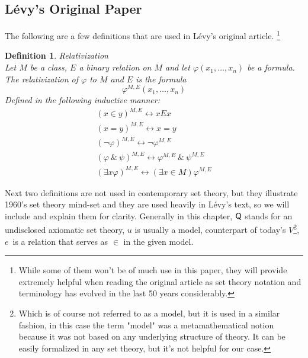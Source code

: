 \documentclass[12pt,a4paper]{article}
\newtheorem{definition}[theorem]{Definition}
\renewcommand{\iff}{\leftrightarrow}
\begin{document}
\subsection{Lévy's Original Paper}\label{sec:Levy1960}

The following are a few definitions that are used in Lévy's original article. \footnote{While some of them won't be of much use in this paper, they will provide extremely helpful when reading the original article as set theory notation and terminology has evolved in the last 50 years considerably.}

\begin{definition}{Relativization}\label{def:relativization}\cite[Definition 12.6]{JechBook}\\ 
Let $M$ be a class, $E$ a binary relation on $M$ and let $\varphi(x_1, \ldots, x_n)$ be a formula. The relativization of $\varphi$ to $M$ and $E$ is the formula
\begin{equation}
\varphi^{M, E}(x_1, \ldots, x_n)
\end{equation}
Defined in the following inductive manner:
\begin{equation}
\begin{split}
(x \in y)^{M,E} \iff x E x\\
(x = y)^{M,E} \iff x = y\\
(\neg \varphi)^{M,E} \iff \neg \varphi^{M,E}\\
(\varphi\ \&\ \psi)^{M,E} \iff \varphi^{M,E}\ \&\ \psi^{M,E}\\
(\exists x\varphi)^{M,E} \iff (\exists x \in M) \varphi^{M,E}
\end{split}
\end{equation}
\end{definition}

Next two definitions are not used in contemporary set theory, but they illustrate 1960's set theory mind-set and they are used heavily in Lévy's text, so we will include and explain them for clarity. Generally in this chapter, $\sf{Q}$ stands for an undisclosed axiomatic set theory, $u$ is usually a model, counterpart of today's $V$\footnote{Which is of course not referred to as a model, but it is used in a similar fashion, in this case the term "model" was a metamathematical notion because it was not based on any underlying structure of theory. It can be easily formalized in any set theory, but it's not helpful for our case.}, $e$ is a relation that serves as $\in$ in the given model.
\end{document}
